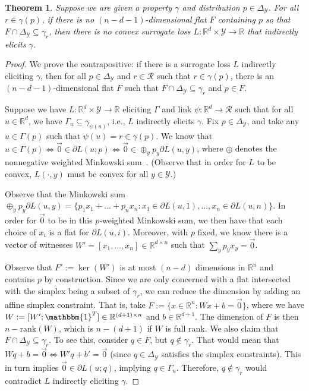 \documentclass{article}
\newcommand{\reals}{\mathbb{R}}
\newcommand{\simplex}{\Delta_\Y}
\newcommand{\R}{\mathcal{R}}
\newcommand{\Y}{\mathcal{Y}}
\newtheorem{theorem}{Theorem}
\begin{document}
\begin{theorem}\label{thm:cvx-flats}
	Suppose we are given a property $\gamma$ and distribution $p \in \simplex$.
	For all $r\in\gamma(p)$, if there is no $(n - d-1)$-dimensional flat $F$ containing $p$ so that $F \cap \simplex \subseteq \gamma_r$, then there is no convex surrogate loss $L : \reals^d \times \Y \to \reals$ that indirectly elicits $\gamma$.
\end{theorem}
\begin{proof}[Proof]
	We prove the contrapositive: if there is a surrogate loss $L$ indirectly eliciting $\gamma$, then for all $p \in \simplex$ and $r \in \R$ such that $r \in \gamma(p)$, there is an $(n-d-1)$-dimensional flat $F$ such that $F \cap \simplex \subseteq \gamma_r$ and $p \in F$.
	
	Suppose we have $L:\reals^d \times \Y \to \reals$ eliciting $\Gamma$ and link $\psi : \reals^d \to \R$ such that for all $u \in \reals^d$, we have $\Gamma_u \subseteq \gamma_{\psi(u)}$, i.e., $L$ indirectly elicits $\gamma$.
	Fix $p \in \simplex$, and take any $u \in \Gamma(p)$ such that $\psi(u) = r \in \gamma(p)$.
	We know that $u \in \Gamma(p) \iff \vec 0 \in \partial L(u; p) \iff \vec 0 \in \oplus_y p_y \partial L(u,y)$, where $\oplus$ denotes the nonnegative weighted Minkowski sum~\cite[Theorem 4.1.1]{hiriart2012fundamentals}.  (Observe that in order for $L$ to be convex, $L(\cdot, y)$ must be convex for all $y \in \Y$.) 
	
	Observe that the Minkowski sum $\oplus_y p_y \partial L(u,y) = \{p_1 x_1 + \ldots + p_n x_n : x_1 \in \partial L(u,1), \ldots, x_n \in \partial L(u,n) \}$.
	In order for $\vec 0$ to be in this $p$-weighted Minkowski sum, we then have that each choice of $x_i$ is a flat for $\partial L(u, i)$.
	Moreover, with $p$ fixed, we know there is a vector of witnesses $W' = [x_1, \ldots, x_n] \in \reals^{d\times n}$ such that $\sum_y p_y x_y = \vec 0$.

	Observe that $F' := \ker(W')$ is at most $(n-d)$ dimensions in $\reals^n$ and contains $p$ by construction.
	Since we are only concerned with a flat intersected with the simplex being a subset of $\gamma_r$, we can reduce the dimension by adding an affine simplex constraint. 
	That is, take $F := \{x \in \reals^n : W x + b = \vec 0\}$, where we have $W := [W'; \mathbbm{1}^T] \in \reals^{(d+1) \times n}$ and $b \in \reals^{d+1}$.
	The dimension of $F$ is then $n - \mathrm{rank}(W)$, which is $n - (d+1)$ if $W$ is full rank.
	We also claim that $F \cap \simplex \subseteq \gamma_r$.
	To see this, consider $q \in F$, but $q \not \in \gamma_r$.
	That would mean that $Wq + b = \vec 0 \iff W'q + b' = \vec 0$ (since $q \in \simplex$ satisfies the simplex constraints).
	This in turn implies $\vec 0 \in \partial L(u;q)$, implying $q \in \Gamma_u$.
	Therefore, $q \not \in \gamma_r$ would contradict $L$ indirectly eliciting $\gamma$.
\end{proof}
\end{document}
